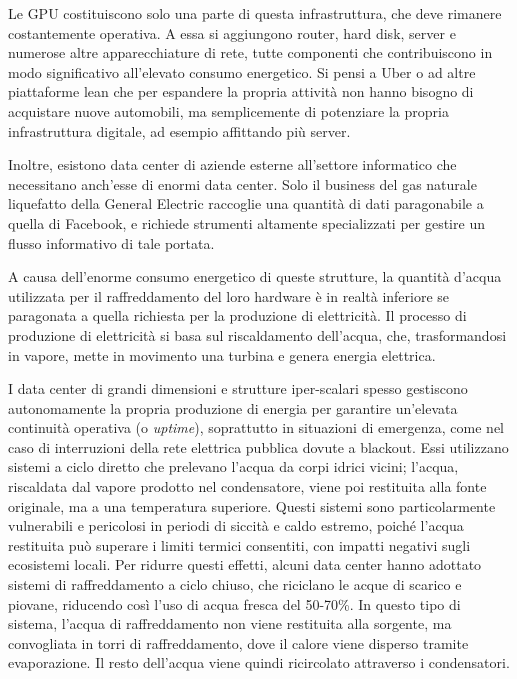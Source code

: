 \documentclass[12pt,a4paper,oneside]{book}
\begin{document}
Le GPU costituiscono solo una parte di questa infrastruttura, che deve rimanere costantemente operativa. A essa si aggiungono router, hard disk, server e numerose altre apparecchiature di rete, tutte componenti che contribuiscono in modo significativo all'elevato consumo energetico. Si pensi a Uber o ad altre piattaforme lean che per espandere la propria attività non hanno bisogno di acquistare nuove automobili, ma semplicemente di potenziare la propria infrastruttura digitale, ad esempio affittando più server. \citep[p.31]{srnicek2017platform}

Inoltre, esistono data center di aziende esterne all'settore informatico che necessitano anch'esse di enormi data center. Solo il business del gas naturale liquefatto della General Electric raccoglie una quantità di dati paragonabile a quella di Facebook, e richiede strumenti altamente specializzati per gestire un flusso informativo di tale portata. \citep[p.40]{srnicek2017platform}

A causa dell'enorme consumo energetico di queste strutture, la quantità d'acqua utilizzata per il raffreddamento del loro hardware è in realtà inferiore se paragonata a quella richiesta per la produzione di elettricità. Il processo di produzione di elettricità si basa sul riscaldamento dell'acqua, che, trasformandosi in vapore, mette in movimento una turbina e genera energia elettrica.

I data center di grandi dimensioni e strutture iper-scalari spesso gestiscono autonomamente la propria produzione di energia per garantire un'elevata continuità operativa (o \textit{uptime}), soprattutto in situazioni di emergenza, come nel caso di interruzioni della rete elettrica pubblica dovute a blackout.
Essi utilizzano sistemi a ciclo diretto che prelevano l'acqua da corpi idrici vicini; l'acqua, riscaldata dal vapore prodotto nel condensatore, viene poi restituita alla fonte originale, ma a una temperatura superiore. Questi sistemi sono particolarmente vulnerabili e pericolosi in periodi di siccità e caldo estremo, poiché l'acqua restituita può superare i limiti termici consentiti, con impatti negativi sugli ecosistemi locali.
Per ridurre questi effetti, alcuni data center hanno adottato sistemi di raffreddamento a ciclo chiuso, che riciclano le acque di scarico e piovane, riducendo così l'uso di acqua fresca del 50-70\%. In questo tipo di sistema, l'acqua di raffreddamento non viene restituita alla sorgente, ma convogliata in torri di raffreddamento, dove il calore viene disperso tramite evaporazione. Il resto dell'acqua viene quindi ricircolato attraverso i condensatori.
\end{document}
